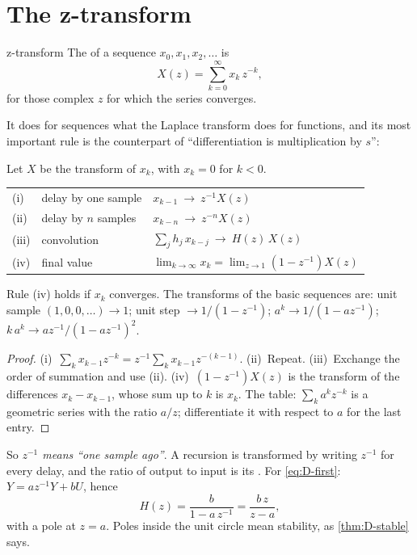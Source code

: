 \section{The z-transform}

\begin{definition}{z-transform}
The  of a sequence $x_0, x_1, x_2, \dots$ is
\begin{equation}
  X(z) = \sum_{k=0}^{\infty} x_k\,z^{-k} ,
\end{equation}
for those complex $z$ for which the series converges.
\end{definition}

It does for sequences what the Laplace transform does for functions, and its most important rule is the counterpart of \enquote{differentiation is multiplication by $s$}:

\begin{theorem}
\label{thm:D-rules}
Let $X$ be the transform of $x_k$, with $x_k = 0$ for $k < 0$.
\begin{center}
\renewcommand{\arraystretch}{1.4}
\begin{tabular}{@{}lll@{}}
(i) & delay by one sample & $x_{k-1} \ \to\ z^{-1}X(z)$\\
(ii) & delay by $n$ samples & $x_{k-n} \ \to\ z^{-n}X(z)$\\
(iii) & convolution & $\sum_j h_j\,x_{k-j} \ \to\ H(z)\,X(z)$\\
(iv) & final value & $\lim_{k \to \infty}x_k = \lim_{z \to 1}(1 - z^{-1})X(z)$\\
\end{tabular}
\end{center}
Rule (iv) holds if $x_k$ converges. The transforms of the basic sequences are: unit sample $(1, 0, 0, \dots) \to 1$; unit step $\to 1/(1 - z^{-1})$; $a^k \to 1/(1 - a z^{-1})$; $k\,a^k \to a z^{-1}/(1 - az^{-1})^2$.
\end{theorem}
\begin{proof}
(i)~$\sum_k x_{k-1}z^{-k} = z^{-1}\sum_k x_{k-1}z^{-(k-1)}$. (ii)~Repeat. (iii)~Exchange the order of summation and use (ii). (iv)~$(1 - z^{-1})X(z)$ is the transform of the differences $x_k - x_{k-1}$, whose sum up to $k$ is $x_k$. The table: $\sum_k a^kz^{-k}$ is a geometric series with the ratio $a/z$; differentiate it with respect to $a$ for the last entry.
\end{proof}

So \emph{$z^{-1}$ means \enquote{one sample ago}}. A recursion is transformed by writing $z^{-1}$ for every delay, and the ratio of output to input is its . For \cref{eq:D-first}: $Y = a z^{-1}Y + bU$, hence
\begin{equation}\label{eq:D-H}
  H(z) = \frac{b}{1 - a\,z^{-1}} = \frac{b\,z}{z - a},
\end{equation}
with a pole at $z = a$. Poles inside the unit circle mean stability, as \cref{thm:D-stable} says.

